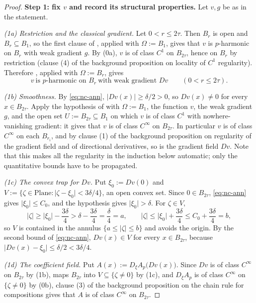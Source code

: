 \begin{proof}
\medskip\noindent\textbf{Step 1: fix $v$ and record its structural properties.}
Let $v,g$ be as in the statement.

\emph{(1a) Restriction and the classical gradient.}  Let $0<r\le2\tau$.  Then $B_r$ is open and
$B_r\subseteq B_1$, so the first clause of , applied with
$\Omega:=B_1$, gives that $v$ is $p$-harmonic on $B_r$ with weak gradient $g$.  By (0a), $v$ is
of class $C^{1}$ on $B_{2\tau}$, hence on $B_r$ by restriction (clause (4) of the background
proposition on locality of $C^{1}$ regularity).  Therefore
, applied with $\Omega:=B_r$, gives
\begin{equation}\label{eq:nc-classical}
  v\ \text{is $p$-harmonic on }B_r\ \text{with weak gradient } Dv \qquad(0<r\le2\tau).
\end{equation}

\emph{(1b) Smoothness.}  By \eqref{eq:nc-ann}, $\lvert Dv(x)\rvert\ge\delta/2>0$, so
$Dv(x)\ne0$ for every $x\in B_{2\tau}$.  Apply the hypothesis of
 with $\Omega:=B_1$, the function $v$, the weak gradient
$g$, and the open set $U:=B_{2\tau}\subseteq B_1$ on which $v$ is of class $C^{1}$ with
nowhere-vanishing gradient: it gives that $v$ is of class $C^{\infty}$ on $B_{2\tau}$.  In
particular $v$ is of class $C^{\infty}$ on each $B_{r_i}$, and by clause (1) of the background
proposition on regularity of the gradient field and of directional derivatives, so is the
gradient field $Dv$.  Note that this makes all the regularity in the induction below automatic;
only the quantitative bounds have to be propagated.

\emph{(1c) The convex trap for $Dv$.}  Put $\xi_0:=Dv(0)$ and
$V:=\{\zeta\in\mathrm{Plane}:\lvert\zeta-\xi_0\rvert<3\delta/4\}$, an open convex set.  Since
$0\in B_{2\tau}$, \eqref{eq:nc-ann} gives $\lvert\xi_0\rvert\le C_0$, and the hypothesis gives
$\lvert\xi_0\rvert>\delta$.  For $\zeta\in V$,
\[
  \lvert\zeta\rvert\ge\lvert\xi_0\rvert-\frac{3\delta}{4}>\delta-\frac{3\delta}{4}
  =\frac{\delta}{4}=a,
  \qquad
  \lvert\zeta\rvert\le\lvert\xi_0\rvert+\frac{3\delta}{4}\le C_0+\frac{3\delta}{4}=b,
\]
so $V$ is contained in the annulus $\{a\le\lvert\zeta\rvert\le b\}$ and avoids the origin.  By
the second bound of \eqref{eq:nc-ann}, $Dv(x)\in V$ for every $x\in B_{2\tau}$, because
$\lvert Dv(x)-\xi_0\rvert\le\delta/2<3\delta/4$.

\emph{(1d) The coefficient field.}  Put $A(x):=D_\xi A_p\bigl(Dv(x)\bigr)$.  Since $Dv$ is of
class $C^{\infty}$ on $B_{2\tau}$ by (1b), maps $B_{2\tau}$ into $V\subseteq\{\zeta\ne0\}$ by
(1c), and $D_\xi A_p$ is of class $C^{\infty}$ on $\{\zeta\ne0\}$ by (0b), clause (3) of the
background proposition on the chain rule for compositions gives that $A$ is of class
$C^{\infty}$ on $B_{2\tau}$.


\end{proof}
